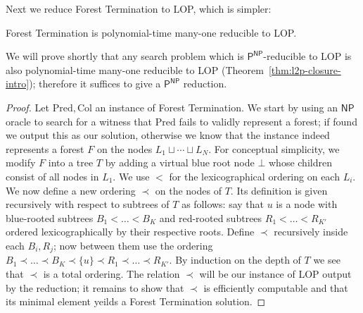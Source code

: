 Next we reduce {\sc Forest Termination} to {\sc LOP}, which is simpler:
\begin{lemma}\label{lem:forest-lop}
{\sc Forest Termination} is polynomial-time many-one reducible to {\sc LOP}.
\end{lemma}
We will prove shortly that any search problem which is $\mathsf{P^{NP}}$-reducible to {\sc LOP} is also polynomial-time many-one reducible to {\sc LOP} (Theorem~\ref{thm:l2p-closure-intro}); therefore it suffices to give a $\mathsf{P^{NP}}$ reduction.
\begin{proof}
Let $\mathrm{Pred},\mathrm{Col}$ an instance of {\sc Forest Termination}. We start by using an $\mathsf{NP}$ oracle to search for a witness that $\mathrm{Pred}$ fails to validly represent a forest; if found we output this as our solution, otherwise we know that the instance indeed represents a forest $F$ on the nodes $L_1 \sqcup \cdots \sqcup L_N$. For conceptual simplicity, we modify $F$ into a tree $T$ by adding a virtual blue root node $\bot$ whose children consist of all nodes in $L_1$. We use $<$ for the lexicographical ordering on each $L_i$. We now define a new ordering $\prec$ on the nodes of $T$. Its definition is given recursively with respect to subtrees of $T$ as follows: say that $u$ is a node with blue-rooted subtrees $B_1 < \ldots < B_K$ and red-rooted subtrees $R_1<\ldots<R_{K'}$ ordered lexicographically by their respective roots. Define $\prec$ recursively inside each $B_i, R_j$; now between them use the ordering $B_1 \prec \ldots \prec B_K \prec \{u\} \prec R_1 \prec \ldots \prec R_{K'}$. By induction on the depth of $T$ we see that $\prec$ is a total ordering. The relation $\prec$ will be our instance of {\sc LOP} output by the reduction; it remains to show that $\prec$ is efficiently computable and that its minimal element yeilds a {\sc Forest Termination} solution.


\end{proof}
